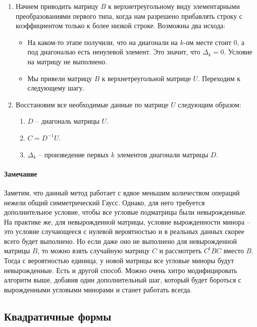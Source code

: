 \begin{enumerate}
\item Начнем приводить матрицу $B$ к верхнетреугольному виду элементарными преобразованиями первого типа, когда нам разрешено прибавлять строку с коэффициентом только к более низкой строке.
Возможны два исхода:
\begin{itemize}
\item На каком-то этапе получили, что на диагонали на $k$-ом месте стоит $0$, а под диагональю есть ненулевой элемент.
Это значит, что $\Delta_k = 0$.
Условие на матрицу не выполнено.

\item Мы привели матрицу $B$ к верхнетреугольной матрице $U$.
Переходим к следующему шагу.
\end{itemize}

\item Восстановим все необходимые данные по матрице $U$ следующим образом:
\begin{enumerate}
\item $D$ -- диагональ матрицы $U$.

\item $C =  D^{-1}U$.

\item $\Delta_k$ -- произведение первых $k$ элементов диагонали матрицы $D$.
\end{enumerate}
\end{enumerate}

\paragraph{Замечание}

Заметим, что данный метод работает с вдвое меньшим количеством операций нежели общий симметрический Гаусс.
Однако, для него требуется дополнительное условие, чтобы все  угловые подматрицы были невырожденные.
На практике же, для невырожденной матрицы, условие вырожденности минора -- это условие случающееся с нулевой вероятностью и в реальных данных скорее всего будет выполнено.
Но если даже оно не выполнено для невырожденной матрицы $B$, то можно взять случайную матрицу $C$ и рассмотреть $C^tBC$ вместо $B$.
Тогда с вероятностью единица, у новой матрицы все угловые миноры будут невырожденные.
Есть и другой способ.
Можно очень хитро модифицировать алгоритм выше, добавив один дополнительный шаг, который будет бороться с вырожденными угловыми минорами и станет работать всегда.


\subsection{Квадратичные формы}


